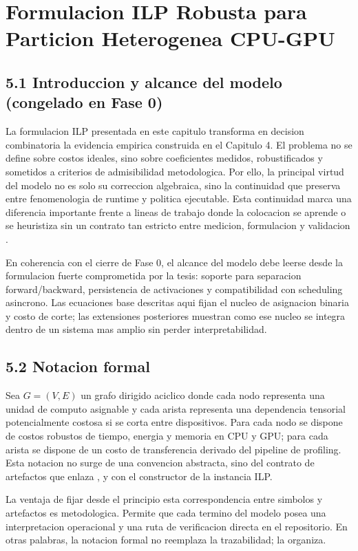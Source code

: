 \chapter{Formulacion ILP Robusta para Particion Heterogenea CPU-GPU}

\section{5.1 Introduccion y alcance del modelo (congelado en Fase 0)}
La formulacion ILP presentada en este capitulo transforma en decision combinatoria la evidencia empirica construida en el Capitulo 4. El problema no se define sobre costos ideales, sino sobre coeficientes medidos, robustificados y sometidos a criterios de admisibilidad metodologica. Por ello, la principal virtud del modelo no es solo su correccion algebraica, sino la continuidad que preserva entre fenomenologia de runtime y politica ejecutable. Esta continuidad marca una diferencia importante frente a lineas de trabajo donde la colocacion se aprende o se heuristiza sin un contrato tan estricto entre medicion, formulacion y validacion \cite{mirhoseini2017device,jia2019beyond,zheng2022alpa}.

En coherencia con el cierre de Fase 0, el alcance del modelo debe leerse desde la formulacion fuerte comprometida por la tesis: soporte para separacion forward/backward, persistencia de activaciones y compatibilidad con scheduling asincrono. Las ecuaciones base descritas aqui fijan el nucleo de asignacion binaria y costo de corte; las extensiones posteriores muestran como ese nucleo se integra dentro de un sistema mas amplio sin perder interpretabilidad.

\section{5.2 Notacion formal}
Sea $G=(V,E)$ un grafo dirigido aciclico donde cada nodo representa una unidad de computo asignable y cada arista representa una dependencia tensorial potencialmente costosa si se corta entre dispositivos. Para cada nodo se dispone de costos robustos de tiempo, energia y memoria en CPU y GPU; para cada arista se dispone de un costo de transferencia derivado del pipeline de profiling. Esta notacion no surge de una convencion abstracta, sino del contrato de artefactos que enlaza ,  y  con el constructor de la instancia ILP.

La ventaja de fijar desde el principio esta correspondencia entre simbolos y artefactos es metodologica. Permite que cada termino del modelo posea una interpretacion operacional y una ruta de verificacion directa en el repositorio. En otras palabras, la notacion formal no reemplaza la trazabilidad; la organiza.

